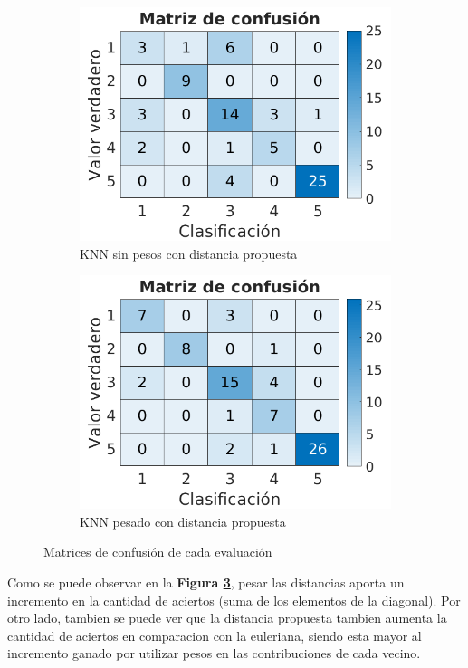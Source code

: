 \documentclass[a4paper]{article}
\newcommand{\reffig}[1]{\textbf{Figura \ref{#1}}}
\begin{document}
\begin{figure}[h]
\begin{subfigure}{.4\textwidth}
    \includegraphics[width=\linewidth]{img/cm-weul.png}
    \caption{KNN sin pesos con distancia propuesta}
    \label{sent-cm:sfig3}
  \end{subfigure}
  \begin{subfigure}{.4\textwidth}
    \centering
    \includegraphics[width=\linewidth]{img/cm-wcust.png}
    \caption{KNN pesado con distancia propuesta}
    \label{sent-cm:sfig4}
  \end{subfigure}
  \caption{Matrices de confusión de cada evaluación}
  \label{sent-cm:fig}
\end{figure}

Como se puede observar en la \reffig{sent-cm:fig}, pesar las distancias aporta un incremento en la cantidad de aciertos (suma de los elementos de la diagonal). Por otro lado, tambien se puede ver que la distancia propuesta tambien aumenta la cantidad de aciertos en comparacion con la euleriana, siendo esta mayor al incremento ganado por utilizar pesos en las contribuciones de cada vecino.
\end{document}
